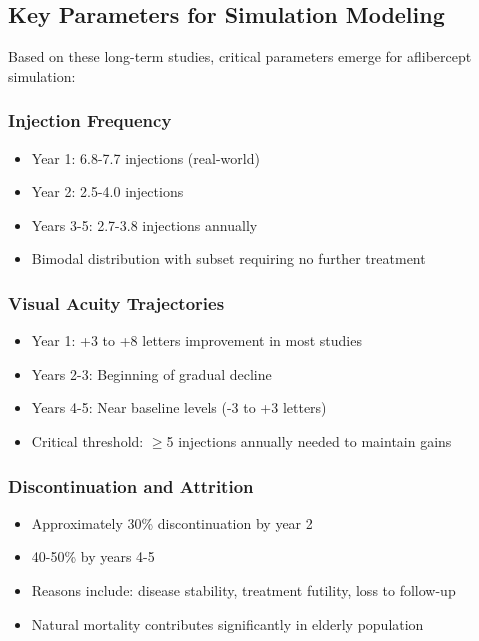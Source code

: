 \subsection{Key Parameters for Simulation Modeling}

Based on these long-term studies, critical parameters emerge for aflibercept simulation:

\subsubsection{Injection Frequency}
\begin{itemize}
    \item Year 1: 6.8-7.7 injections (real-world)
    \item Year 2: 2.5-4.0 injections
    \item Years 3-5: 2.7-3.8 injections annually
    \item Bimodal distribution with subset requiring no further treatment
\end{itemize}

\subsubsection{Visual Acuity Trajectories}
\begin{itemize}
    \item Year 1: +3 to +8 letters improvement in most studies
    \item Years 2-3: Beginning of gradual decline
    \item Years 4-5: Near baseline levels (-3 to +3 letters)
    \item Critical threshold: $\geq$5 injections annually needed to maintain gains
\end{itemize}

\subsubsection{Discontinuation and Attrition}
\begin{itemize}
    \item Approximately 30\% discontinuation by year 2
    \item 40-50\% by years 4-5
    \item Reasons include: disease stability, treatment futility, loss to follow-up
    \item Natural mortality contributes significantly in elderly population
\end{itemize}

